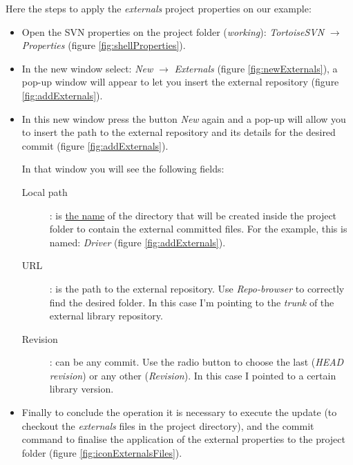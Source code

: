 \newpage

Here the steps to apply the \textit{externals} project properties on our example:



\begin{itemize}

    \item Open the SVN properties on the project folder (\textit{working}): \textit{TortoiseSVN} $\rightarrow$ \textit{Properties} (figure \ref{fig:shellProperties}).
    
    \item In the new window select: \textit{New} $\rightarrow$ \textit{Externals} (figure \ref{fig:newExternals}), a pop-up window will appear to let you insert the external repository (figure \ref{fig:addExternals}).
    
    \item In this new window press the button \textit{New} again and a pop-up will allow you to insert the path to the external repository and its details for the desired commit (figure \ref{fig:addExternals}).\newline
    
    In that window you will see the following fields:
    
    \begin{description}
    
        \item[Local path]: is \underline{the name} of the directory that will be created inside the project folder to contain the external committed files. For the example, this is named: \textit{Driver} (figure \ref{fig:addExternals}).
        
        \item[URL]: is the path to the external repository. Use \textit{Repo-browser} to correctly find the desired folder. In this case I'm pointing to the \textit{trunk} of the external library repository.
        
        \item[Revision]: can be any commit. Use the radio button to choose the last (\textit{HEAD revision}) or any other (\textit{Revision}). In this case I pointed to a certain library version.
    
    \end{description}
    
    \item Finally to conclude the operation it is necessary to execute the update (to checkout the \textit{externals} files in the project directory), and the commit command to finalise the application of the external properties to the project folder (figure \ref{fig:iconExternalsFiles}).
    
    
\end{itemize}








